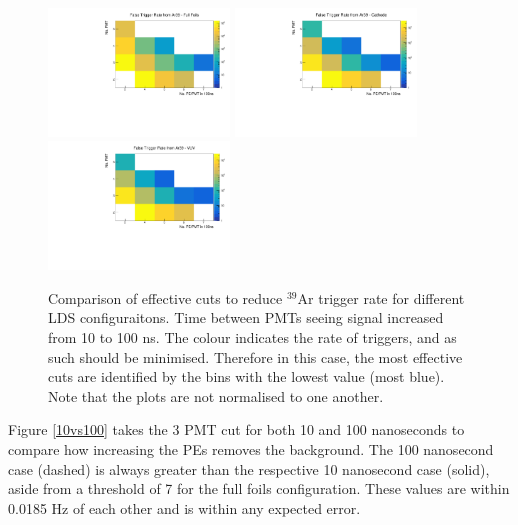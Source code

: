\documentclass[a4paper]{article}
\begin{document}
\begin{figure}[H]
\center
      \includegraphics[width=0.43\textwidth]{trigger_map_100_fullfoils.pdf}
      \includegraphics[width=0.43\textwidth]{trigger_map_100_cathode.pdf}
      \includegraphics[width=0.43\textwidth]{trigger_map_100_vuv.pdf}
      \caption{Comparison of effective cuts to reduce $^{39}$Ar trigger rate for different LDS configuraitons. Time between PMTs seeing signal increased from 10 to 100 ns. The colour indicates the rate of triggers, and as such should be minimised. Therefore in this case, the most effective cuts are identified by the bins with the lowest value (most blue). Note that the plots are not normalised to one another.}\label{ar39_cut_maps_100ns}
\end{figure}

Figure \ref{10vs100} takes the 3 PMT cut for both 10 and 100 nanoseconds to compare how increasing the PEs removes the background. The 100 nanosecond case (dashed) is always greater than the respective 10 nanosecond case (solid), aside from a threshold of 7 for the full foils configuration. These values are within 0.0185 Hz of each other and is within any expected error.
\end{document}

